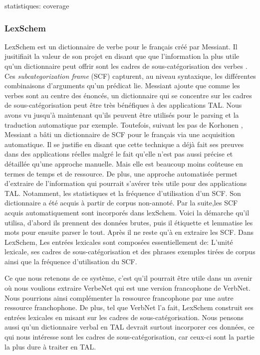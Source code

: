 statistiques: coverage

\subsubsection{LexSchem}
LexSchem est un dictionnaire de verbe pour le français créé par Messiant. Il jusitifiait la valeur de son projet en disant que  que l'information la plus utile qu'un dictionnaire peut offrir sont les cadres de sous-catégorisation des verbes \citep{MESSIANT08.142}. Ces \emph{subcategorization frame} (SCF) capturent, au niveau syntaxique, les différentes combinaisons d'arguments qu'un prédicat lie. Messiant ajoute que comme les verbes sont au centre des énoncés, un dictionnaire qui se concentre sur les cadres de sous-catégorisation peut être très bénéfiques à des applications TAL.  Nous avons vu jusqu'à maintenant qu'ils peuvent être utilisés pour le parsing et la traduction automatique par exemple. Toutefois, suivant les pas de Korhonen \citep{Korhonenlargesubcategorizationlexicon2006}, Messiant a bâti un dictionnaire de SCF pour le français via une acquisition automatique. Il se justifie en disant que cette technique a déjà fait ses preuves dans des applications réelles malgré le fait qu'elle n'est pas aussi précise et détaillée qu'une approche manuelle. Mais elle est beaucoup moins coûteuse en termes de temps et de ressource. De plus, une approche automatisée permet d'extraire de l'information qui pourrait s'avérer très utile pour des applications TAL. Notamment, les statistiques et la fréquence d'utilisation d'un SCF.  Son dictionnaire a été acquis à partir de corpus non-annoté. Par la suite,les SCF acquis automatiquement sont incorporés dans lexSchem. Voici la démarche qu'il utilisa, d'abord ils prennent des données brutes, puis il étiquette et lemmatise les mots  pour ensuite parser le tout. Après il ne reste qu'à en extraire les SCF. Dans LexSchem, Les entrées lexicales sont composées essentiellement de: L'unité lexicale, ses cadres de sous-catégorisation et des phrases exemples tirées de corpus ainsi que la fréquence d'utilisation du SCF.

Ce que nous retenons de ce système, c'est qu'il pourrait être utile dans un avenir où nous voulions extraire VerbeNet qui est une version francophone de VerbNet. Nous pourrions ainsi complémenter la ressource francophone par une autre ressource franchophone. De plus, tel que VerbNet l'a fait, LexSchem construit ses entrées lexicales en misant sur les cadres de sous-catégorisation. Nous pensons aussi qu'un dictionnaire verbal en TAL devrait surtout incorporer ces données, ce qui nous intéresse sont les cadres de sous-catégorisation, car ceux-ci sont la partie la plus dure à traiter en TAL.

